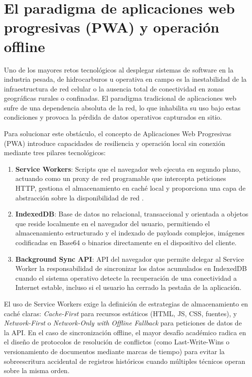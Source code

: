 \section{El paradigma de aplicaciones web progresivas (PWA) y operación offline}

Uno de los mayores retos tecnológicos al desplegar sistemas de software en la industria pesada, de hidrocarburos u operativa en campo es la inestabilidad de la infraestructura de red celular o la ausencia total de conectividad en zonas geográficas rurales o confinadas. El paradigma tradicional de aplicaciones web sufre de una dependencia absoluta de la red, lo que inhabilita su uso bajo estas condiciones y provoca la pérdida de datos operativos capturados en sitio.

Para solucionar este obstáculo, el concepto de Aplicaciones Web Progresivas (PWA) introduce capacidades de resiliencia y operación local sin conexión mediante tres pilares tecnológicos:
\begin{enumerate}
    \item \textbf{Service Workers}: Scripts que el navegador web ejecuta en segundo plano, actuando como un proxy de red programable que intercepta peticiones HTTP, gestiona el almacenamiento en caché local y proporciona una capa de abstracción sobre la disponibilidad de red \cite{mdn_service_worker}.
    \item \textbf{IndexedDB}: Base de datos no relacional, transaccional y orientada a objetos que reside localmente en el navegador del usuario, permitiendo el almacenamiento estructurado y el indexado de payloads complejos, imágenes codificadas en Base64 o binarios directamente en el dispositivo del cliente.
    \item \textbf{Background Sync API}: API del navegador que permite delegar al Service Worker la responsabilidad de sincronizar los datos acumulados en IndexedDB cuando el sistema operativo detecte la recuperación de una conectividad a Internet estable, incluso si el usuario ha cerrado la pestaña de la aplicación.
\end{enumerate}

El uso de Service Workers exige la definición de estrategias de almacenamiento en caché claras: \textit{Cache-First} para recursos estáticos (HTML, JS, CSS, fuentes), y \textit{Network-First} o \textit{Network-Only with Offline Fallback} para peticiones de datos de la API. En el caso de sincronización offline, el mayor desafío académico radica en el diseño de protocolos de resolución de conflictos (como Last-Write-Wins o versionamiento de documentos mediante marcas de tiempo) para evitar la sobreescritura accidental de registros históricos cuando múltiples técnicos operan sobre la misma orden.

